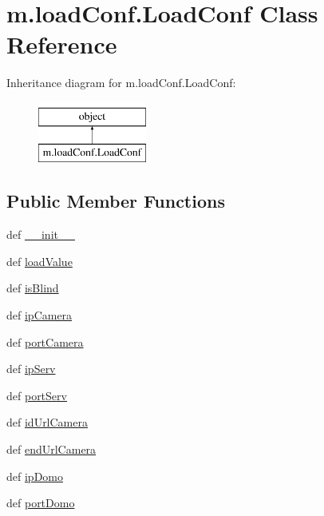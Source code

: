 \hypertarget{classm_1_1load_conf_1_1_load_conf}{\section{m.\-load\-Conf.\-Load\-Conf Class Reference}
\label{classm_1_1load_conf_1_1_load_conf}
}
Inheritance diagram for m.\-load\-Conf.\-Load\-Conf\-:\begin{figure}[H]
\begin{center}
\leavevmode
\includegraphics[height=2.000000cm]{classm_1_1load_conf_1_1_load_conf}
\end{center}
\end{figure}
\subsection*{Public Member Functions}
\begin{DoxyCompactItemize}
\item 
def \hyperlink{classm_1_1load_conf_1_1_load_conf_a2443a99a4a23bec9199a3c69e9570b5c}{\-\_\-\-\_\-init\-\_\-\-\_\-}
\item 
def \hyperlink{classm_1_1load_conf_1_1_load_conf_ae831fd20f8770ee87d26e6c34febea5b}{load\-Value}
\item 
def \hyperlink{classm_1_1load_conf_1_1_load_conf_ac3be38f004ccea7185b261b0e16ccbc2}{is\-Blind}
\item 
def \hyperlink{classm_1_1load_conf_1_1_load_conf_a90af7dd2fda7be0dea8b4a65ce38eb2f}{ip\-Camera}
\item 
def \hyperlink{classm_1_1load_conf_1_1_load_conf_a6db2941a05e53d8eb028c38dce89a5dc}{port\-Camera}
\item 
def \hyperlink{classm_1_1load_conf_1_1_load_conf_a855f4f41860aa066b816236cc074f471}{ip\-Serv}
\item 
def \hyperlink{classm_1_1load_conf_1_1_load_conf_a5318b43bf50966159fee6a88bce49e45}{port\-Serv}
\item 
def \hyperlink{classm_1_1load_conf_1_1_load_conf_aa13e3a8882b8967afbdec6e1b984a0df}{id\-Url\-Camera}
\item 
def \hyperlink{classm_1_1load_conf_1_1_load_conf_a690fbd9ee268ac71df2b5b061c9c46a0}{end\-Url\-Camera}
\item 
def \hyperlink{classm_1_1load_conf_1_1_load_conf_ab4d22d50a55664a4b82954af8f5ad327}{ip\-Domo}
\item 
def \hyperlink{classm_1_1load_conf_1_1_load_conf_ac04a37d96bd5ab4cd6a680d13359691a}{port\-Domo}
\end{DoxyCompactItemize}
